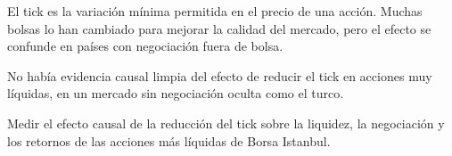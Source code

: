 \documentclass{article}
\newcommand{\bodysize}{\fontsize{32}{42.2}\selectfont}
\newcommand{\cardtitlesize}{\fontsize{37.8}{45.4}\selectfont}
\newcommand{\smallsize}{\fontsize{26.2}{34.1}\selectfont}
\newcommand{\cardtitle}[2][navy]{{\color{#1}\cardtitlesize\bfseries\textls[110]{\MakeUppercase{#2}}}\par\vspace{7mm}}
\begin{document}
\vfill
\hspace*{34mm}\begin{minipage}{773mm}
\begin{tcolorbox}[enhanced, sharp corners, colback=navy, boxrule=0pt, left=16mm, right=16mm, top=12mm, bottom=11mm,
  fontupper=\bodysize\raggedright, overlay={\fill[gold] (frame.north west) rectangle ([yshift=-5mm]frame.north east);}]
\begin{minipage}[t]{174.8mm}\raggedright{\color{acento}\smallsize\bfseries{}}\par{}\end{minipage}\hfill\begin{minipage}[t]{174.8mm}\raggedright{\color{acento}\smallsize\bfseries{}}\par{}\end{minipage}\hfill\begin{minipage}[t]{174.8mm}\raggedright{\color{acento}\smallsize\bfseries{}}\par{}\end{minipage}\hfill\begin{minipage}[t]{174.8mm}\raggedright{\color{acento}\smallsize\bfseries{}}\par{}\end{minipage}
\end{tcolorbox}
\end{minipage}

\vfill
\hspace*{34mm}\begin{minipage}{773mm}
\begin{tcbraster}[raster columns=3, raster equal height, raster column skip=16mm]
\begin{tcolorbox}[card]\cardtitle{Contexto}El tick es la variación mínima permitida en el precio de una acción. Muchas bolsas lo han cambiado para mejorar la calidad del mercado, pero el efecto se confunde en países con negociación fuera de bolsa.\end{tcolorbox}
\begin{tcolorbox}[card]\cardtitle{Problema}No había evidencia causal limpia del efecto de reducir el tick en acciones muy líquidas, en un mercado sin negociación oculta como el turco.\end{tcolorbox}
\begin{tcolorbox}[card]\cardtitle{Objetivo}Medir el efecto causal de la reducción del tick sobre la liquidez, la negociación y los retornos de las acciones más líquidas de Borsa Istanbul.\end{tcolorbox}
\end{tcbraster}
\end{minipage}
\end{document}
